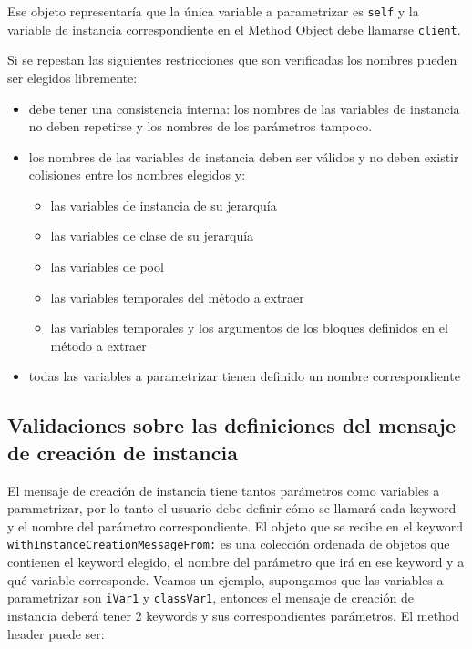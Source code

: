 Ese objeto representaría que la única variable a parametrizar es
\lstinline{self} y la variable de instancia correspondiente en el Method Object
debe llamarse \lstinline{client}.

Si se repestan las siguientes restricciones que son verificadas los nombres
pueden ser elegidos libremente:

\begin{itemize}
    \item debe tener una consistencia interna: los nombres de las variables de
      instancia no deben repetirse y los nombres de los parámetros tampoco.
    \item los nombres de las variables de instancia deben ser válidos y no deben
      existir colisiones entre los nombres elegidos y:
    \begin{itemize}
        \item las variables de instancia de su jerarquía
        \item las variables de clase de su jerarquía
        \item las variables de pool
        \item las variables temporales del método a extraer
        \item las variables temporales y los argumentos de los bloques definidos
          en el método a extraer
    \end{itemize}
    \item todas las variables a parametrizar tienen definido un nombre
      correspondiente
\end{itemize}




\subsection*{Validaciones sobre las definiciones del mensaje de creación de instancia}

El mensaje de creación de instancia tiene tantos parámetros como variables a
parametrizar, por lo tanto el usuario debe definir cómo se llamará cada keyword
y el nombre del parámetro correspondiente. El objeto que se recibe en el keyword
\lstinline{withInstanceCreationMessageFrom:} es una colección ordenada de
objetos que contienen el keyword elegido, el nombre del parámetro que irá en ese
keyword y a qué variable corresponde. Veamos un ejemplo, supongamos que las
variables a parametrizar son \lstinline{iVar1} y \lstinline{classVar1}, entonces
el mensaje de creación de instancia deberá tener 2 keywords y sus
correspondientes parámetros. El method header puede ser:

